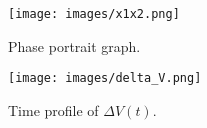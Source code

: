 \documentclass[1p,times]{elsarticle}
\begin{document}




\begin{figure}[!t]
    \centering
    \texttt{[image: images/x1x2.png]}\\
    \caption{{{\color{blue}}Phase portrait graph.}}
    \label{fig:x1x2}
\end{figure}

\begin{figure}[!t]
    \centering
\texttt{[image: images/delta\_V.png]}\\
    \caption{{{\color{blue}}Time profile of $\Delta V(t)$.}}
    \label{fig:deltav}
\end{figure}


\end{document}
